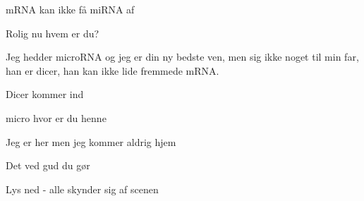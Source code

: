 \documentclass[a4paper,11pt]{article}
\begin{document}
\begin{sketch}
\scene mRNA kan ikke få miRNA af


 Rolig nu hvem er du?


 Jeg hedder microRNA og jeg er din ny bedste ven, men sig ikke noget til min far, han er dicer, han kan ikke lide fremmede mRNA. 


\scene Dicer kommer ind


 micro hvor er du henne


Jeg er her men jeg kommer aldrig hjem


 Det ved gud du gør




\scene Lys ned - alle skynder sig af scenen

\end{sketch}
\end{document}
